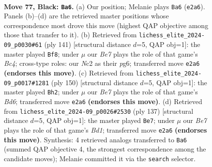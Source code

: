 \documentclass[11pt]{article}
\begin{document}
\clearpage

\begin{figure}[p]\centering
\begin{subfigure}{0.46\textwidth}\centering
\resizebox{\linewidth}{!}{%
\newchessgame
\chessboard[
  setfen={8/6k1/8/8/5B2/7K/2n1bP2/8 b - - 0 77},
  showmover=false,
  pgfstyle=straightmove, color=movearrow, markmove={e2-a6}
]}
\caption{}
\end{subfigure}\hfill
\begin{subfigure}{0.46\textwidth}\centering
\resizebox{\linewidth}{!}{%
\newchessgame
\chessboard[
  setfen={2B5/8/6P1/1Pb1k3/8/3K4/8/8 b - - 0 71},
  showmover=false,
  pgfstyle=straightmove, color=movearrow, markmove={c5-f8}
]}
\caption{}
\end{subfigure}
\\[4pt]
\begin{subfigure}{0.46\textwidth}\centering
\resizebox{\linewidth}{!}{%
\newchessgame
\chessboard[
  setfen={b2k4/8/3Bp3/8/8/4K3/8/8 w - - 47 76},
  showmover=false,
  pgfstyle=straightmove, color=movearrow, markmove={d6-h2}
]}
\caption{}
\end{subfigure}\hfill
\begin{subfigure}{0.46\textwidth}\centering
\resizebox{\linewidth}{!}{%
\newchessgame
\chessboard[
  setfen={3b4/8/2K1P3/7B/8/k7/8/8 b - - 2 69},
  showmover=false,
  pgfstyle=straightmove, color=movearrow, markmove={d8-e7}
]}
\caption{}
\end{subfigure}
\caption{\textbf{Move 77, Black: \texttt{Ba6}.} (a) Our position; Melanie plays \texttt{Ba6} (\texttt{e2a6}). Panels (b)--(d) are the retrieved master positions whose correspondence most drove this move (highest QAP objective among those that transfer to it). (b) Retrieved from \texttt{lichess\_elite\_2024-09\_p0030\#61} (ply 141) [structural distance $d$=5, QAP obj=1]: the master played \texttt{Bf8}; under $\mu$ our \emph{Be7} plays the role of that game's \emph{Bc4}; cross-type roles: our \emph{N}c2 as their \emph{p}g6; transferred move \texttt{e2a6} \textbf{(endorses this move)}. (c) Retrieved from \texttt{lichess\_elite\_2024-09\_p0017\#1281} (ply 150) [structural distance $d$=5, QAP obj=1]: the master played \texttt{Bh2}; under $\mu$ our \emph{Be7} plays the role of that game's \emph{Bd6}; transferred move \texttt{e2a6} \textbf{(endorses this move)}. (d) Retrieved from \texttt{lichess\_elite\_2024-09\_p0026\#2530} (ply 137) [structural distance $d$=5, QAP obj=1]: the master played \texttt{Be7}; under $\mu$ our \emph{Be7} plays the role of that game's \emph{Bd1}; transferred move \texttt{e2a6} \textbf{(endorses this move)}. Synthesis: 4 retrieved analogs transferred to \texttt{Ba6} (summed QAP objective 4, the strongest correspondence among the candidate moves); Melanie committed it via the \texttt{search} selector.}
\label{fig:thought-m153}
\end{figure}
\end{document}
